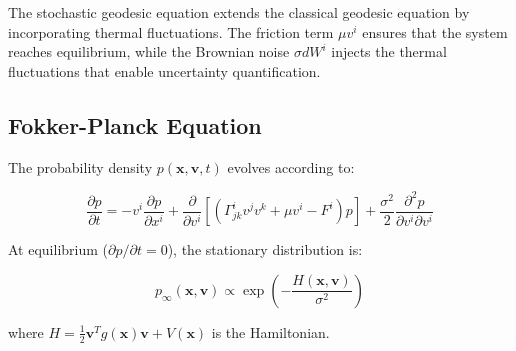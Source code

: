 \documentclass[12pt,a4paper]{article}
\begin{document}
The stochastic geodesic equation extends the classical geodesic equation by incorporating thermal fluctuations. The friction term $\mu v^i$ ensures that the system reaches equilibrium, while the Brownian noise $\sigma dW^i$ injects the thermal fluctuations that enable uncertainty quantification.

\subsection{Fokker-Planck Equation}

The probability density $p(\mathbf{x}, \mathbf{v}, t)$ evolves according to:

\begin{equation}
\frac{\partial p}{\partial t} = -v^i \frac{\partial p}{\partial x^i} 
+ \frac{\partial}{\partial v^i}\left[\left(\Gamma^i_{jk} v^j v^k + \mu v^i - F^i\right)p\right] 
+ \frac{\sigma^2}{2} \frac{\partial^2 p}{\partial v^i \partial v^i}
\end{equation}

At equilibrium ($\partial p/\partial t = 0$), the stationary distribution is:

\begin{equation}
p_\infty(\mathbf{x}, \mathbf{v}) \propto \exp\left(-\frac{H(\mathbf{x}, \mathbf{v})}{\sigma^2}\right)
\end{equation}

where $H = \frac{1}{2}\mathbf{v}^T g(\mathbf{x}) \mathbf{v} + V(\mathbf{x})$ is the Hamiltonian.
\end{document}
